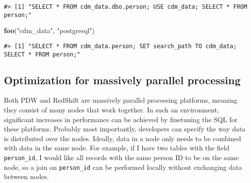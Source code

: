 \documentclass[]{article}
\newenvironment{Shaded}{\begin{snugshade}}{\end{snugshade}}
\newcommand{\CharTok}[1]{\textcolor[rgb]{0.31,0.60,0.02}{#1}}
\newcommand{\ControlFlowTok}[1]{\textcolor[rgb]{0.13,0.29,0.53}{\textbf{#1}}}
\newcommand{\DataTypeTok}[1]{\textcolor[rgb]{0.13,0.29,0.53}{#1}}
\newcommand{\DecValTok}[1]{\textcolor[rgb]{0.00,0.00,0.81}{#1}}
\newcommand{\KeywordTok}[1]{\textcolor[rgb]{0.13,0.29,0.53}{\textbf{#1}}}
\newcommand{\NormalTok}[1]{#1}
\newcommand{\OperatorTok}[1]{\textcolor[rgb]{0.81,0.36,0.00}{\textbf{#1}}}
\newcommand{\StringTok}[1]{\textcolor[rgb]{0.31,0.60,0.02}{#1}}
\begin{document}
\begin{Shaded}
\end{Shaded}

\begin{verbatim}
#> [1] "SELECT * FROM cdm_data.dbo.person; USE cdm_data; SELECT * FROM person;"
\end{verbatim}

\begin{Shaded}
\begin{Highlighting}[]
\KeywordTok{foo}\NormalTok{(}\StringTok{"cdm_data"}\NormalTok{, }\StringTok{"postgresql"}\NormalTok{)}
\end{Highlighting}
\end{Shaded}

\begin{verbatim}
#> [1] "SELECT * FROM cdm_data.person; SET search_path TO cdm_data; SELECT * FROM person;"
\end{verbatim}

\hypertarget{optimization-for-massively-parallel-processing}{%
\subsection{Optimization for massively parallel
processing}\label{optimization-for-massively-parallel-processing}}

Both PDW and RedShift are massively parallel processing platforms,
meaning they consist of many nodes that work together. In such an
environment, significant increases in performance can be achieved by
finetuning the SQL for these platforms. Probably most importantly,
developers can specify the way data is distributed over the nodes.
Ideally, data in a node only needs to be combined with data in the same
node. For example, if I have two tables with the field
\texttt{person\_id}, I would like all records with the same person ID to
be on the same node, so a join on \texttt{person\_id} can be performed
locally without exchanging data between nodes.
\end{document}

